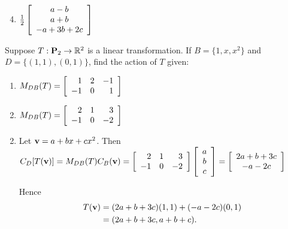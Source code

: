 \begin{multicols}{1}
\begin{ex}
\begin{sol}
\begin{enumerate}[label={\alph*.}]
\setcounter{enumi}{3}
\item  $\tfrac{1}{2}\left[ \begin{array}{c} a - b \\ a + b \\ -a + 3b + 2c \end{array} \right]$


\end{enumerate}
\end{sol}
\end{ex}

\begin{ex}
Suppose $T : \textbf{P}_{2} \to \mathbb{R}^2$ is a linear transformation. If $B = \{ 1, x, x^{2}\}$ and $D = \{(1, 1), (0, 1)\}$, find the action of $T$ given:


\begin{enumerate}[label={\alph*.}]
\item $M_{DB}(T) = \left[ \begin{array}{rrr} 1 & 2 & -1 \\ -1 & 0 & 1 \end{array} \right]$


\item $M_{DB}(T) = \left[ \begin{array}{rrr} 2 & 1 & 3 \\ -1 & 0 & -2 \end{array} \right]$


\end{enumerate}
\begin{sol}
\begin{enumerate}[label={\alph*.}]
\setcounter{enumi}{1}
\item Let $\textbf{v} = a + bx + cx^2$. Then $C_D[T(\textbf{v})] = M_{DB}(T)C_B(\textbf{v}) = \left[ \begin{array}{rrr} 2 & 1 & 3 \\ -1 & 0 & -2 \end{array} \right]\left[ \begin{array}{c} a \\ b \\ c \end{array} \right] = \left[ \begin{array}{c} 2a + b + 3c \\ -a - 2c \end{array} \right]$

Hence
\begin{align*}
T(\textbf{v}) & = (2a + b + 3c)(1, 1) + (-a - 2c)(0, 1) \\
& = (2a + b + 3c, a + b + c).
\end{align*}


\end{enumerate}
\end{sol}
\end{ex}
\end{multicols}
